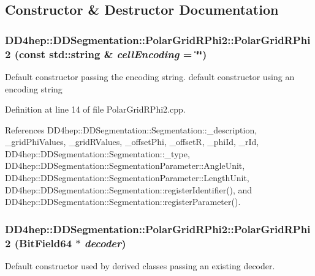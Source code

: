 \subsection{Constructor \& Destructor Documentation}
\hypertarget{class_d_d4hep_1_1_d_d_segmentation_1_1_polar_grid_r_phi2_a88552803b42baa290fc38268bc06f099}{
\subsubsection[{PolarGridRPhi2}]{\setlength{\rightskip}{0pt plus 5cm}DD4hep::DDSegmentation::PolarGridRPhi2::PolarGridRPhi2 (const std::string \& {\em cellEncoding} = {\ttfamily \char`\"{}\char`\"{}})}}
\label{class_d_d4hep_1_1_d_d_segmentation_1_1_polar_grid_r_phi2_a88552803b42baa290fc38268bc06f099}


Default constructor passing the encoding string. default constructor using an encoding string 

Definition at line 14 of file PolarGridRPhi2.cpp.

References DD4hep::DDSegmentation::Segmentation::\_\-description, \_\-gridPhiValues, \_\-gridRValues, \_\-offsetPhi, \_\-offsetR, \_\-phiId, \_\-rId, DD4hep::DDSegmentation::Segmentation::\_\-type, DD4hep::DDSegmentation::SegmentationParameter::AngleUnit, DD4hep::DDSegmentation::SegmentationParameter::LengthUnit, DD4hep::DDSegmentation::Segmentation::registerIdentifier(), and DD4hep::DDSegmentation::Segmentation::registerParameter().\hypertarget{class_d_d4hep_1_1_d_d_segmentation_1_1_polar_grid_r_phi2_ad79eed46ad54d3caf96ef51b8fd29ea7}{
\subsubsection[{PolarGridRPhi2}]{\setlength{\rightskip}{0pt plus 5cm}DD4hep::DDSegmentation::PolarGridRPhi2::PolarGridRPhi2 ({\bf BitField64} $\ast$ {\em decoder})}}
\label{class_d_d4hep_1_1_d_d_segmentation_1_1_polar_grid_r_phi2_ad79eed46ad54d3caf96ef51b8fd29ea7}


Default constructor used by derived classes passing an existing decoder. 

